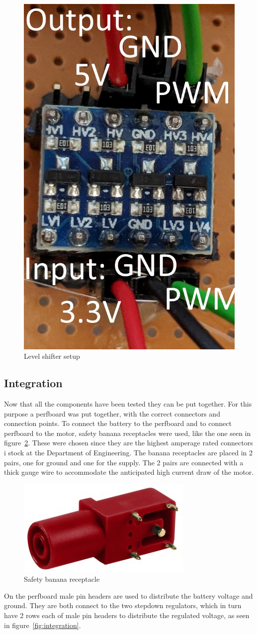 \begin{figure}[H]
\centering
\includegraphics[width=0.3\linewidth]{Images/Implementation/level_shift_setup}
\caption{Level shifter setup}
\label{fig:levelshifter_setup}
\end{figure}

\subsection{Integration}
Now that all the components have been tested they can be put together. For this purpose a perfboard\cite{perfboard} was put together, with the correct connectors and connection points.
To connect the battery to the perfboard and to connect perfboard to the motor, safety banana receptacles\cite{banana-connector} were used, like the one seen in figure~\ref{fig:banana_connector}. These were chosen since they are the highest amperage rated connectors i stock at the Department of Engineering. The banana receptacles are placed in 2 pairs, one for ground and one for the supply. The 2 pairs are connected with a thick gauge wire to accommodate the anticipated high current draw of the motor. 

\begin{figure}[h]
\centering
\includegraphics[width=0.3\linewidth]{Images/Design/safety-banana-receptical}
\caption{Safety banana receptacle\cite{banana-connector}}
\label{fig:banana_connector}
\end{figure}


On the perfboard male pin headers are used to distribute the battery voltage and ground. They are both connect to the two stepdown regulators, which in turn have 2 rows each of male pin headers to distribute the regulated voltage, as seen in figure~\ref{fig:integration}. 


